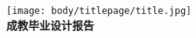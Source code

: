 \begin{titlepage}
\vspace{5em}
\begin{center}
\texttt{[image: body/titlepage/title.jpg]}\\\vspace{1.2em}
{
\textbf{\cukai \fontsize{40pt}{\baselineskip}\selectfont 成教毕业设计报告}
}
\end{center}
\par\vspace{10em}\fontsize{18pt}{\baselineskip}\selectfont 
\hspace{2.5em}
\hspace{.5em}
\end{titlepage}
